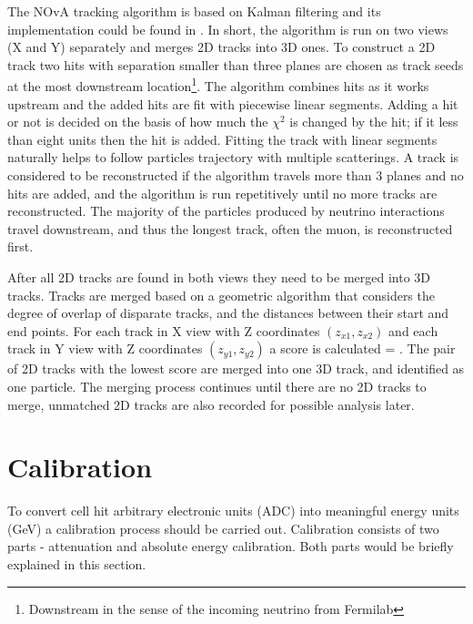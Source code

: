 The NOvA tracking algorithm is based on Kalman filtering \cite{Kalman} and its implementation could be found 
in \cite{Nick}. In short, the algorithm is run on two views (X and Y) separately and merges 2D tracks into
3D ones. To construct a 2D track two hits with separation smaller than three planes are chosen as track 
seeds at the most downstream location\footnote{Downstream in the sense of the incoming neutrino from Fermilab}. 
The algorithm combines hits as it works upstream and the added hits are fit with piecewise linear segments. 
Adding a hit or not 
is decided on the basis of how much the $\chi^2$ is changed by the hit; if it less than eight units 
then the hit is added. Fitting the track with linear segments naturally helps to follow particles trajectory 
with multiple scatterings. A track is considered to be reconstructed if the algorithm travels more than 3 planes
and no hits are added, and the algorithm is run repetitively until no more tracks are reconstructed. 
The majority of the particles produced by neutrino interactions travel downstream, and thus the longest 
track, often the muon, is reconstructed first.

After all 2D tracks are found in both views they need to be merged into 3D tracks. Tracks are merged based on
a geometric algorithm that considers the degree of overlap of disparate tracks, and the distances between
their start and end points. For each track in X view with Z coordinates $(z_{x1}, z_{x2})$ and each track in 
Y view with Z coordinates $(z_{y1}, z_{y2})$ a score is calculated
\be
{} = .
\ee
The pair of 2D tracks with the lowest score are merged into one 3D track, and identified as one particle.
The merging process continues until there are no 2D tracks to merge, unmatched 2D tracks are also recorded
for possible analysis later.

\section{Calibration}
To convert cell hit arbitrary electronic units (ADC) into meaningful energy units (GeV) a calibration 
process should be carried out. Calibration consists of two parts - attenuation and absolute energy calibration. 
Both parts would be briefly explained in this section.

